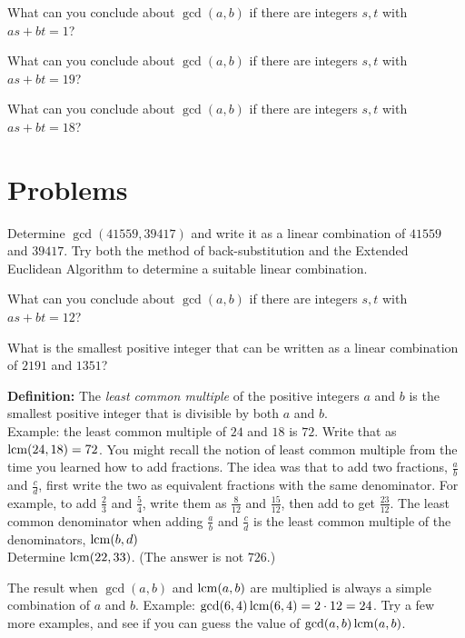 \begin{exer}
What can you conclude about $\gcd(a,b)$ if there are integers $s,t$ with $as+bt=1$?
\end{exer}

\begin{exer}
What can you conclude about $\gcd(a,b)$ if there are integers $s,t$ with $as+bt=19$?
\end{exer}

\begin{exer}
 What can you conclude about $\gcd(a,b)$ if there are integers $s,t$ with
 $as+bt=18$?
\end{exer}

\section{Problems}

\begin{prob}
Determine $\gcd(41559,39417)$ and write it as a linear combination of $41559$ and $39417$.
Try both the method of back-substitution and the Extended Euclidean Algorithm
 to determine a suitable linear combination.
\end{prob}
 
\begin{prob}
 What can you conclude about $\gcd(a,b)$ if there are integers $s,t$ with $as+bt=12$?
 \end{prob}
 
 \begin{prob}
 What is the smallest positive integer that can be written as a linear combination of $2191$ and $1351$?
 \end{prob}
 
 \begin{prob}
 {\bf Definition:} The {\it least common multiple} of the positive integers $a$ and $b$ is the smallest positive integer
 that is divisible by both $a$ and $b$.\\[3pt]
 
 Example: the least common multiple of $24$ and $18$ is $72$. Write that as $\operatorname{lcm}(24,18) = 72$. You might recall
 the notion of least common multiple from the time you learned how to add fractions. The idea was that to add two fractions,
 $\frac{a}{b}$ and $\frac{c}{d}$, first write the two as equivalent fractions with the same denominator. For example, to add 
 $\frac{2}{3}$ and $\frac{5}{4}$, write them as $\frac{8}{12}$ and $\frac{15}{12}$, then add to get $\frac{23}{12}$. 
 The least common denominator when adding $\frac{a}{b}$ and $\frac{c}{d}$ is the least common multiple of the 
 denominators, $\operatorname{lcm}(b,d)$\\
 
 Determine $\operatorname{lcm}(22,33)$. (The answer is not $726$.)
 
 \end{prob}
 
 \begin{prob}
 The result  when $\gcd(a,b)$ and $\operatorname{lcm}(a,b)$ are multiplied is always a simple combination of $a$ and $b$. 
 Example: $\gcd(6,4)\operatorname{lcm}(6,4) = 2\cdot 12 = 24$.
 Try a few more examples, and see if you can guess the value of $\gcd(a,b)\operatorname{lcm}(a,b)$.
 \end{prob}
 
 
 




